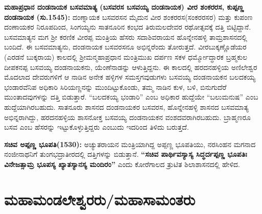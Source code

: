 \textbf{ಮಹಾಪ್ರಧಾನ ದಂಡನಾಯಕ ಬಸವಮಾತ್ಯ (ಬಸವರಸ \general{\enginline{-}} ಬಸವಯ್ಯ ದಂಡನಾಯಕ) ವೀರ ಶಂಕರರಸ, ಕುಪ್ಪಣ್ಣ ದಂಡನಾಯಕ (ಸು.1545):} ದಂಣ್ನಾಯಕ ಬಸವರಸನ ಮೈದುನ ವೀರ ಶಂಕರರಸ(ಸಂಕರರಸರ) ಮತ್ತು ಕುಪಂಣ ದಂಣಾಯಕರ ನಿರೂಪದಿಂದ, ಸಿಂಗಯ್ಯನು ಸಾತನೂರಿನ ಕಂಭದ ತಿರುಮಲದೇವರ ರಥೋತ್ಸವಕ್ಕೆ ದತ್ತಿ ಬಿಟ್ಟಿದ್ದಾನೆ. ಬಸವಮಾತ್ಯನ ಮಗ ಶ‍್ರೀ ಕರಣಿಕ ವೀರಪ್ಪ ಮಂತ್ರಿಯ ಹೆಸರು ಸದಾಶಿವರಾಯನ ಹೊನ್ನೇನಹಳ್ಳಿ ತಾಮ್ರಶಾಸನದಲ್ಲಿ ಬಂದಿದೆ. ಈ ಬಸವಮಾತ್ಯನು, ದಂಡನಾಯಕ ಬಸವರಸನೂ ಅಭಿನ್ನರೆಂದು ತೋರುತ್ತದೆ. ವೀರಬುಕ್ಕಣ್ಣೊಡೆಯರ (ಎರಡನೆ ಬುಕ್ಕರಾಯ) ಕಾಲದಲ್ಲಿ ಶ‍್ರೀಮನ್ಮಹಾಪ್ರಧಾನ ಮಂತ್ರಿಮುಖ ದರ್ಪಣ ಸಕಳ ಧರ್ಮ್ಮೋದ್ಧಾರಕ ಬ್ರಹ್ಮಕುಲ ದೀಪಕನಪ್ಪ ಬಸವಯ್ಯ ದಂಡನಾಯಕನು, ಯೆಂಣೆನಾಡನ್ನು ಆಳುತ್ತಿದ್ದನು. ಈ ಕಾಲದಲ್ಲಿ ಹರದನಹಳ್ಳಿಯ ಅಣಿಲೇಶ್ವರ ಮೊದಲಾದ ದೇವರುಗಳಿಗೆ ಆ ನಾಡಿನ ಅನೇಕ ಹಳ್ಳಿಗಳ ಸಮಸ್ತಗವುಡುಗಳು ಬಸವಯ್ಯ ದಂಡನಾಯಕನ ಬಲದಕಯ್ಯ ಭಂಡಾರವೆನಿಪ ಅಧಿಕಾರಿ ಸಿರಿಯಣ್ಣನನ್ನು ಮುಂದಿಟ್ಟುಕೊಂಡು, ತಮ್ಮ ನಾಡಿನ ಕುಳ, ಬಳಿ, ಬಿನುಗುದೆರೆ ಮುಂತಾದವುಗಳನ್ನು ದತ್ತಿ ಬಿಡುತ್ತಾರೆ. “ಬಲದಕಯ್ಯ ಭಂಡಾರಿ” ಎಂಬ ಅಧಿಕಾರ ಹುದ್ದೆಯೇ “ಬಲುಮನುಷ” ಎಂಬ ಹುದ್ದೆಯಾಗಿರಬಹುದು. ಸಾತನೂರು ಶಾಸನದ ದಂಡನಾಯಕರ ಬಸವರಸ, ಹೊನ್ನೇನಹಳ್ಳಿ ಶಾಸನದ ಬಸವಮಾತ್ಯ ಅಭಿನ್ನರಾಗಿದ್ದು, ಹರದನಹಳ್ಳಿಯ ಶಾಸನೋಕ್ತ ಬಸವಯ್ಯ ದಂಡನಾಯಕನ ವಂಶದವರಾಗಿರಬಹುದು. ಬ್ರಾಹ್ಮಣರೂ ಬಸವ ಎಂಬ ಹೆಸರನ್ನು ಇಟ್ಟುಕೊಳ್ಳುತ್ತಿದ್ದರು ಎಂಬುದು ಇದರಿಂದ ತಿಳಿದು ಬರುತ್ತದೆ.

\textbf{ಸಚಿವ ಅಪ್ಪಣ್ಣ ಭೂಪತಿ(1530):} ಅಚ್ಯುತರಾಯನ ಮಂತ್ರಿಯಾಗಿದ್ದ ಅಪ್ಪಣ್ಣ ಭೂಪತಿಯು, ನರಸಿಂಹನ ಮಗನಾದ ನಂಜೀನಾಥನಿಗೆ ತುಂಗಭದ್ರಾತೀರದಲ್ಲಿ ದತ್ತಿಗಳನ್ನು ಬಿಡುತ್ತಾನೆ. \textbf{“ಸಚಿವ ಪಾರ್ಥಿವಸ್ಯಾಸ್ಯ ಸಿದ್ಧರ್ದಪ್ಪಣ್ಣ ಭೂಪತಿಃ ವಿನೇಜತ್ಸಾಮ್ರ ಭೂಪಸ್ಯ ಖ್ಯಾತಸ್ಯಾನಸ್ಯ ಮಂದಿರಂ”} ಎಂದು ಕೋರೆಗಾಲದ ತ್ರುಟಿತ ಶಿಲಾಶಾಸನದಲ್ಲಿ ಹೇಳಿದ.

\section{ಮಹಾಮಂಡಲೇಶ್ವರರು/ಮಹಾಸಾಮಂತರು}


